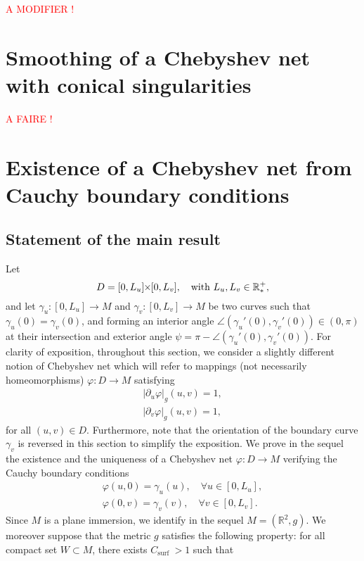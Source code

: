 \documentclass{article}
\newcommand{\Csurf}{C_{\text{surf }}}
\newcommand{\PLH}{{\mkern-1mu\times\mkern-1mu}}
\newcommand{\Times}{\PLH}
\newcommand{\R}{\mathbb{R}}
\newcommand{\surf}{M}
\newcommand{\modif}[1]{\textcolor{red}{#1}}
\theoremstyle{remark}
\theoremstyle{prpart}
\begin{document}
\modif{A MODIFIER !}

\section{Smoothing of a Chebyshev net with conical singularities}
\modif{A FAIRE !}

\section{Existence of a Chebyshev net from Cauchy boundary conditions}
\label{sec:chap4}
\subsection{Statement of the main result}
Let 
\begin{equation*}
  D=[0,L_u]\Times[0,L_v],\quad\text{with } L_u,L_v\in\R_\ast^+,
\end{equation*}
 and let $\gamma_u:[0,L_u]\to\surf$ and $\gamma_v:[0,L_v]\to\surf$ be
 two curves such that $\gamma_u(0)=\gamma_v(0)$, and forming an
 interior angle $\angle(\gamma_u'(0),\gamma_v'(0))\in(0,\pi)$ at their
 intersection and exterior angle
 $\psi=\pi-\angle(\gamma_u'(0),\gamma_v'(0))$. For clarity of
 exposition, throughout this section, we consider a slightly different
 notion of Chebyshev net which will refer to mappings (not necessarily
 homeomorphisms) $\varphi:D\to\surf$ satisfying
\begin{subequations}\label{eq:cheb-def-c3}
\begin{align}\label{eq:cheb-def-c3a}
|\partial_u \varphi|_g(u,v) = 1,\\
|\partial_v \varphi|_g(u,v) = 1,\label{eq:cheb-def-c3b}
\end{align}
\end{subequations}
for all $(u,v)\in D$. Furthermore, note that the orientation of the boundary curve $\gamma_v$ is reversed in this section to simplify the exposition. 
We prove in the sequel the existence and the uniqueness of a Chebyshev net $\varphi:D\to\surf$ verifying the Cauchy boundary conditions
\begin{equation}\label{eq:cond-bord-c3}
\begin{split}
  \varphi(u,0)=\gamma_u(u),\quad\forall u\in[0,L_u],\\ 
  \varphi(0,v)=\gamma_v(v),\quad\forall v\in[0,L_v].
\end{split}
\end{equation}
Since $\surf$ is a plane immersion, we identify in the sequel $\surf=(\R^2,g)$. We moreover suppose that the metric $g$ satisfies the following property: for all compact set $W\subset\surf$, there exists $\Csurf>1$ such that 
\end{document}
